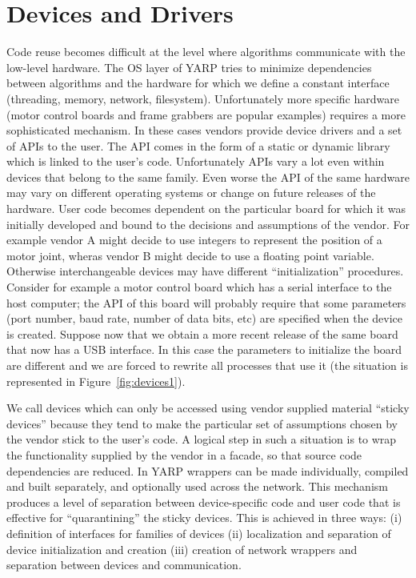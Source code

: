 \section{Devices and Drivers}
Code reuse becomes difficult at the level where algorithms 
communicate with the low-level hardware. The OS layer of YARP tries 
to minimize dependencies between algorithms and the hardware for 
which we define a constant interface (threading, 
memory, network, filesystem). Unfortunately more specific hardware 
(motor control boards and frame grabbers are popular 
examples) requires a more sophisticated mechanism. In these 
cases vendors provide device drivers and a set of APIs to the user.
The API comes in the form of a static or dynamic 
library which is linked to the user's code. Unfortunately
APIs vary a lot even within devices that belong to the same family. 
Even worse the API of the same hardware may vary on different 
operating systems or change on future releases of the hardware. User 
code becomes dependent on the particular board for which it was initially 
developed and bound to the decisions and assumptions of the vendor. For 
example vendor A might decide to use integers to represent the position 
of a motor joint, wheras vendor B might decide to use a floating point
variable. Otherwise interchangeable devices may have different ``initialization'' 
procedures. Consider for example a motor control board which has a serial
interface to the host computer; the API of this board will probably require 
that some parameters (port number, baud rate, number of data bits, etc) are 
specified when the device is created. Suppose now that we obtain a more 
recent release of the same board that now has a USB interface. In this 
case the parameters to initialize the board are different and we are forced 
to rewrite all processes that use it (the situation is 
represented in Figure~\ref{fig:devices1}). 

We call devices which can only be accessed using vendor 
supplied material ``sticky devices'' 
because they tend to make the particular set of assumptions chosen by 
the vendor stick to the user's code. A logical step in such a situation 
is to wrap the functionality supplied by the vendor in a facade, so that 
source code dependencies are reduced. In YARP wrappers can be 
made individually, compiled and built separately, and optionally used 
across the network. This mechanism produces a level of separation between 
device-specific code and user code that is effective for ``quarantining'' the 
sticky devices. This is achieved in three ways: (i) definition of interfaces 
for families of devices (ii) localization and separation of device 
initialization and creation (iii) creation of network wrappers and separation 
between devices and communication. 

